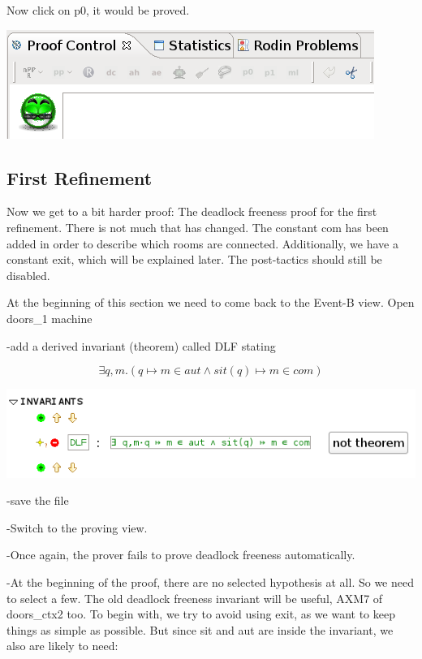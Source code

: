 Now click on p0, it would be proved.

\begin{center}
	\includegraphics[]{img/tutorial/tut_10_proved.png}
\end{center}

\subsection{First Refinement}

Now we get to a bit harder proof: The deadlock freeness proof for the first refinement. There is not much that has changed. The constant com has been added in order to describe which rooms are connected. Additionally, we have a constant exit, which will be explained later. The post-tactics should still be disabled. 

At the beginning of this section we need to come back to the \textsf{Event-B view}.
Open doors\_1 machine

-add a derived invariant (theorem) called DLF stating 

\[
\exists q,m.(q \mapsto m \in aut \land sit(q) \mapsto m \in com )
\]

\begin{center}
	\includegraphics[]{img/tutorial/tut_10_invariants2.png}
\end{center}

-save the file

-Switch to the proving view.

-Once again, the prover fails to prove deadlock freeness automatically. 

-At the beginning of the proof, there are no selected hypothesis at all. So we need to select a few. The old deadlock freeness invariant will be useful, AXM7 of doors\_ctx2 too. To begin with, we try to avoid using exit, as we want to keep things as simple as possible. But since sit and aut are inside the invariant, we also are likely to need:

